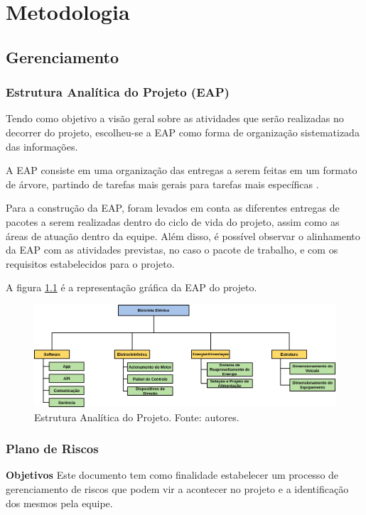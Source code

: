 \chapter{Metodologia}
  \section{Gerenciamento}
    \subsection{Estrutura Analítica do Projeto (EAP)}

      Tendo como objetivo a visão geral sobre as atividades que serão
      realizadas no decorrer do projeto, escolheu-se a EAP como forma
      de organização sistematizada das informações.

      A EAP consiste em uma organização das entregas
      a serem feitas em um formato de árvore, partindo de tarefas
      mais gerais para tarefas mais específicas \cite{pmbok2012}.

      Para a construção da EAP, foram levados em conta as diferentes
      entregas de pacotes a serem realizadas dentro do ciclo de vida do projeto,
      assim como as áreas de atuação dentro da equipe. Além disso, é
      possível observar o alinhamento da EAP com as atividades previstas, no caso o pacote de trabalho, e com os requisitos estabelecidos para o projeto.

      A figura \ref{fig:eap} é a representação gráfica da EAP do projeto.

      \begin{figure}[H]%
        \centering
        \includegraphics[width=\textwidth]{figuras/Eap.png}
        \caption{Estrutura Analítica do Projeto. Fonte: autores.}
        \label{fig:eap}
      \end{figure}

      \vfill
      \pagebreak

	\subsection{Plano de Riscos}
	\textbf{Objetivos}
		Este documento tem como finalidade estabelecer um processo de gerenciamento de riscos que podem vir a acontecer no projeto e a identificação dos mesmos pela equipe.
		
